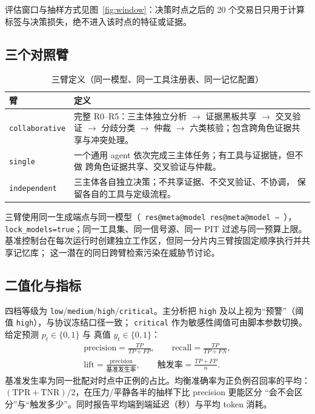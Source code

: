 \documentclass[UTF8,fontset=fandol,11pt,a4paper]{ctexart}
\makeatletter
\newcommand{\RESULT}[2]{%
  \ifcsname res@#1@#2\endcsname
    \csname res@#1@#2\endcsname
  \else
    --%
  \fi}
\makeatother
\begin{document}
评估窗口与抽样方式见图~\ref{fig:window}：决策时点之后的 20 个交易日只用于计算
标签与决策损失，绝不进入该时点的特征或证据。

\subsection{三个对照臂}

\begin{table}[t]
\centering
\caption{三臂定义（同一模型、同一工具注册表、同一记忆配置）}
\label{tab:arms}
\footnotesize
\begin{tabular}{>{\raggedright\arraybackslash}p{2.9cm}
                >{\raggedright\arraybackslash}p{11.2cm}}
\toprule
臂 & 定义 \\
\midrule
\texttt{collaborative} & 完整 R0--R5：三主体独立分析 $\rightarrow$ 证据黑板共享
$\rightarrow$ 交叉验证 $\rightarrow$ 分歧分类 $\rightarrow$ 仲裁 $\rightarrow$
六类核验；包含跨角色证据共享与冲突处理。 \\
\texttt{single} & 一个通用 agent 依次完成三主体任务；有工具与证据链，但不做
跨角色证据共享、交叉验证与仲裁。 \\
\texttt{independent} & 三主体各自独立决策；不共享证据、不交叉验证、不协调，
保留各自的工具与定级流程。 \\
\bottomrule
\end{tabular}
\end{table}

三臂使用同一生成端点与同一模型（\texttt{\RESULT{meta}{model}}），
\texttt{lock\_models=true}；同一工具集、同一信号源、同一 PIT 过滤与同一预算上限。
基准控制台在每次运行时创建独立工作区，但同一分片内三臂按固定顺序执行并共享记忆库；
这一潜在的同日跨臂检索污染在威胁节讨论。

\subsection{二值化与指标}

四档等级为 \texttt{low}/\texttt{medium}/\texttt{high}/\texttt{critical}。主分析把
\texttt{high} 及以上视为“预警”（阈值 \texttt{high}），与协议冻结口径一致；
\texttt{critical} 作为敏感性阈值可由脚本参数切换。给定预测 $p_t\in\{0,1\}$ 与
真值 $y_t\in\{0,1\}$：
\begin{gather}
  \mathrm{precision} = \frac{TP}{TP+FP}, \qquad
  \mathrm{recall} = \frac{TP}{TP+FN}, \\
  \mathrm{lift} = \frac{\mathrm{precision}}{\text{基准发生率}}, \qquad
  \text{触发率} = \frac{TP+FP}{n}.
\end{gather}
基准发生率为同一批配对时点中正例的占比。均衡准确率为正负例召回率的平均：
$(\mathrm{TPR}+\mathrm{TNR})/2$，在压力/平静各半的抽样下比 precision 更能区分
“会不会区分”与“触发多少”。同时报告平均端到端延迟（秒）与平均 token 消耗。
\end{document}
